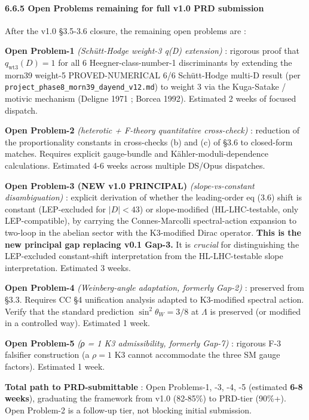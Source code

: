 \documentclass[
  11pt,
  a4paper,
]{article}
\begin{document}
\hypertarget{open-problems-remaining-for-full-v1.0-prd-submission}{%
\paragraph{6.6.5 Open Problems remaining for full v1.0 PRD submission}\label{open-problems-remaining-for-full-v1.0-prd-submission}}

After the v1.0 §3.5-3.6 closure, the remaining open problems are :

\textbf{Open Problem-1} \emph{(Schütt-Hodge weight-3 q(D) extension)} : rigorous proof that \(q_{\mathrm{wt3}}(D) = 1\) for all 6 Heegner-class-number-1 discriminants by extending the morn39 weight-5 PROVED-NUMERICAL 6/6 Schütt-Hodge multi-D result (per \texttt{project\_phase8\_morn39\_dayend\_v12.md}) to weight 3 via the Kuga-Satake / motivic mechanism (Deligne 1971 ; Borcea 1992). Estimated 2 weeks of focused dispatch.

\textbf{Open Problem-2} \emph{(heterotic + F-theory quantitative cross-check)} : reduction of the proportionality constants in cross-checks (b) and (c) of §3.6 to closed-form matches. Requires explicit gauge-bundle and Kähler-moduli-dependence calculations. Estimated 4-6 weeks across multiple DS/Opus dispatches.

\textbf{Open Problem-3 (NEW v1.0 PRINCIPAL)} \emph{(slope-vs-constant disambiguation)} : explicit derivation of whether the leading-order eq (3.6) shift is constant (LEP-excluded for \(|D| < 43\)) or slope-modified (HL-LHC-testable, only LEP-compatible), by carrying the Connes-Marcolli spectral-action expansion to two-loop in the abelian sector with the K3-modified Dirac operator. \textbf{This is the new principal gap replacing v0.1 Gap-3.} It is \emph{crucial} for distinguishing the LEP-excluded constant-shift interpretation from the HL-LHC-testable slope interpretation. Estimated 3 weeks.

\textbf{Open Problem-4} \emph{(Weinberg-angle adaptation, formerly Gap-2)} : preserved from §3.3. Requires CC §4 unification analysis adapted to K3-modified spectral action. Verify that the standard prediction \(\sin^2\theta_W = 3/8\) at \(\Lambda\) is preserved (or modified in a controlled way). Estimated 1 week.

\textbf{Open Problem-5} \emph{(ρ = 1 K3 admissibility, formerly Gap-7)} : rigorous F-3 falsifier construction (a \(\rho = 1\) K3 cannot accommodate the three SM gauge factors). Estimated 1 week.

\textbf{Total path to PRD-submittable} : Open Problems-1, -3, -4, -5 (estimated \textbf{6-8 weeks}), graduating the framework from v1.0 (82-85\%) to PRD-tier (90\%+). Open Problem-2 is a follow-up tier, not blocking initial submission.
\end{document}

